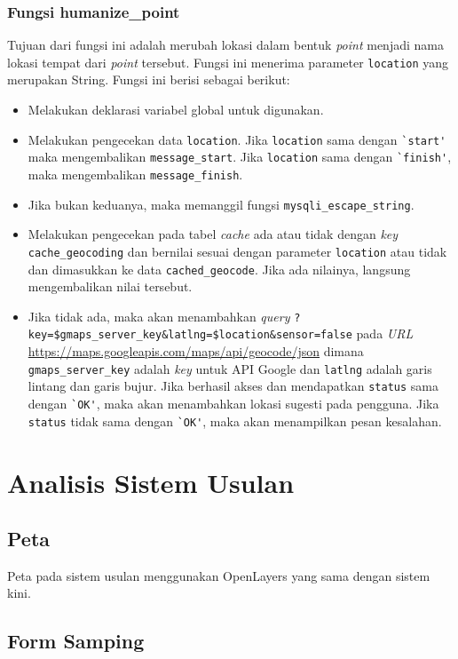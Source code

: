 \subsubsection{Fungsi humanize\_point}
Tujuan dari fungsi ini adalah merubah lokasi dalam bentuk \textit{point} menjadi nama lokasi tempat dari \textit{point} tersebut. Fungsi ini menerima parameter \verb!location! yang merupakan String. Fungsi ini berisi sebagai berikut:
\begin{itemize}
	\item Melakukan deklarasi variabel global untuk digunakan.
	\item Melakukan pengecekan data \verb!location!. Jika \verb!location! sama dengan \verb!`start'! maka mengembalikan \verb!message_start!. Jika \verb!location! sama dengan \verb!`finish'!, maka mengembalikan \verb!message_finish!.
	\item Jika bukan keduanya, maka memanggil fungsi \verb!mysqli_escape_string!.
	\item Melakukan pengecekan pada tabel \textit{cache} ada atau tidak dengan \textit{key} \verb!cache_geocoding! dan bernilai sesuai dengan parameter \verb!location! atau tidak dan dimasukkan ke data \verb!cached_geocode!. Jika ada nilainya, langsung mengembalikan nilai tersebut.
	\item Jika tidak ada, maka akan menambahkan \textit{query} \verb!?key=$gmaps_server_key&latlng=$location&sensor=false! pada \textit{URL} \url{https://maps.googleapis.com/maps/api/geocode/json} dimana \verb!gmaps_server_key! adalah \textit{key} untuk API Google dan \verb!latlng! adalah garis lintang dan garis bujur. Jika berhasil akses dan mendapatkan \verb!status! sama dengan \verb!`OK'!, maka akan menambahkan lokasi sugesti pada pengguna. Jika \verb!status! tidak sama dengan \verb!`OK'!, maka akan menampilkan pesan kesalahan. 
\end{itemize}
\section{Analisis Sistem Usulan}
\label{sec:perubahan}

\subsection{Peta}
Peta pada sistem usulan menggunakan OpenLayers yang sama dengan sistem kini.

\subsection{Form Samping}
